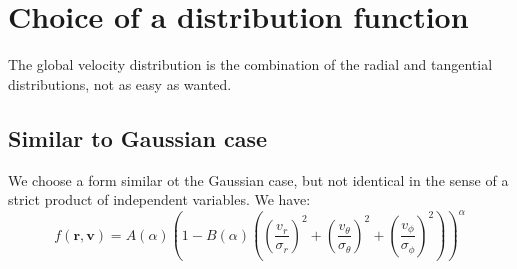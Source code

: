 \section{Choice of a distribution function}
\label{sec:choice_of_a_distribution_function}

The global velocity distribution is the combination of the radial and
tangential distributions, not as easy as wanted.

\subsection{Similar to Gaussian case}
\label{sub:similar_to_gaussian_case}

We choose a form similar ot the Gaussian case, but not identical in the
sense of a strict product of independent variables. We have:
%
\begin{equation}
    f\left(\textbf{r},\textbf{v}\right)=
    A\left(\alpha\right)
    {\left(1-B\left(\alpha\right)\left(
                {\left(\frac{v_r}{\sigma_r}\right)}^2+
                {\left(\frac{v_{\theta}}{\sigma_{\theta}}\right)}^2+
                {\left(\frac{v_{\phi}}{\sigma_{\phi}}\right)}^2
    \right)\right)}^\alpha
\end{equation}
%

